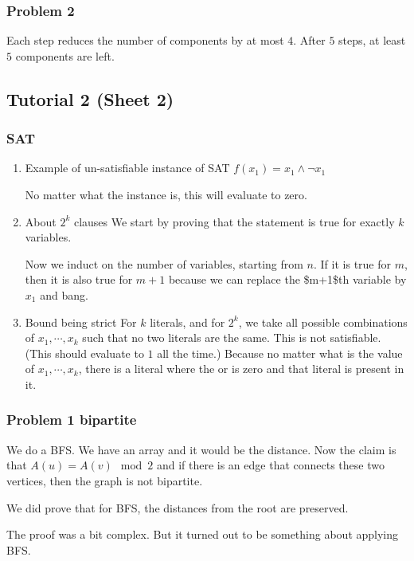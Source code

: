 \documentclass[11pt]{article}
\begin{document}
\subsubsection{Problem 2}
\label{sec:org8b8e4c8}
Each step reduces the number of components by at most \(4\). After \(5\) steps, at least \(5\) components are left.
\subsection{Tutorial 2 (Sheet 2)}
\label{sec:org503b75e}
\subsubsection{SAT}
\label{sec:orgcdbf9af}
\begin{enumerate}
\item Example of un-satisfiable instance of SAT
\label{sec:orgc104bdc}
\(f(x_1) = x_1 \wedge \neg x_1\)

No matter what the instance is, this will evaluate to zero.
\item About \(2^k\) clauses
\label{sec:org71aa0ea}
We start by proving that the statement is true for exactly \(k\) variables.

Now we induct on the number of variables, starting from \(n\). If it is true
for \(m\), then it is also true for \(m+1\) because we can replace the \$m+1\$th
variable by \(x_1\) and bang.
\item Bound being strict
\label{sec:orgf2ba98f}
For \(k\) literals, and for \(2^k\), we take all possible combinations of \(x_1,
     \cdots, x_k\) such that no two literals are the same. This is not
satisfiable. (This should evaluate to \(1\) all the time.) Because no matter
what is the value of \(x_1, \cdots, x_k\), there is a literal where the or is
zero and that literal is present in it.
\end{enumerate}
\subsubsection{Problem 1 bipartite}
\label{sec:org37a314f}
We do a BFS. We have an array and it would be the distance. Now the claim is
that \(A(u) = A(v) \mod 2\) and if there is an edge that connects these two
vertices, then the graph is not bipartite.

We did prove that for BFS, the distances from the root are preserved.

The proof was a bit complex. But it turned out to be something about
applying BFS.
\end{document}
